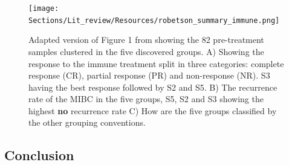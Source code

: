 \begin{figure}[!htb]    
    \centering
\texttt{[image: Sections/Lit\_review/Resources/robetson\_summary\_immune.png]}
    \caption{Adapted version of Figure 1 from \cite{Robertson2023-na} showing the 82 pre-treatment samples clustered in the five discovered groups. A) Showing the response to the immune treatment split in three categories: complete response (CR), partial response (PR) and non-response (NR). S3 having the best response followed by S2 and S5. B) The recurrence rate of the MIBC in the five groups, S5, S2 and S3 showing the highest \textbf{no} recurrence rate C) How are the five groups classified by the other grouping conventions.}
    \label{fig:lit:immune_rob}
\end{figure}


\subsection{Conclusion}


\pagebreak

